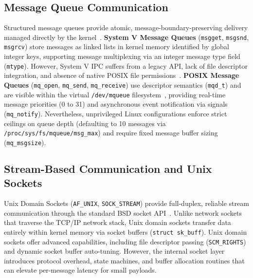 \subsection{Message Queue Communication}
Structured message queues provide atomic, message-boundary-preserving delivery managed directly by the kernel~\cite{kerrisk2010linux}. 
\textbf{System V Message Queues} (\texttt{msgget}, \texttt{msgsnd}, \texttt{msgrcv}) store messages as linked lists in kernel memory identified by global integer keys, supporting message multiplexing via an integer message type field (\texttt{mtype}). However, System V IPC suffers from a legacy API, lack of file descriptor integration, and absence of native POSIX file permissions~\cite{stevens1999unixipc}.
\textbf{POSIX Message Queues} (\texttt{mq\_open}, \texttt{mq\_send}, \texttt{mq\_receive}) use descriptor semantics (\texttt{mqd\_t}) and are visible within the virtual \texttt{/dev/mqueue} filesystem~\cite{posix2018standard}, providing real-time message priorities (0 to 31) and asynchronous event notification via signals (\texttt{mq\_notify}). Nevertheless, unprivileged Linux configurations enforce strict ceilings on queue depth (defaulting to 10 messages via \texttt{/proc/sys/fs/mqueue/msg\_max}) and require fixed message buffer sizing (\texttt{mq\_msgsize}).

\subsection{Stream-Based Communication and Unix Sockets}
Unix Domain Sockets (\texttt{AF\_UNIX}, \texttt{SOCK\_STREAM}) provide full-duplex, reliable stream communication through the standard BSD socket API~\cite{stevens2004unix}. Unlike network sockets that traverse the TCP/IP network stack, Unix domain sockets transfer data entirely within kernel memory via socket buffers (\texttt{struct sk\_buff}). Unix domain sockets offer advanced capabilities, including file descriptor passing (\texttt{SCM\_RIGHTS}) and dynamic socket buffer auto-tuning. However, the internal socket layer introduces protocol overhead, state machines, and buffer allocation routines that can elevate per-message latency for small payloads.

